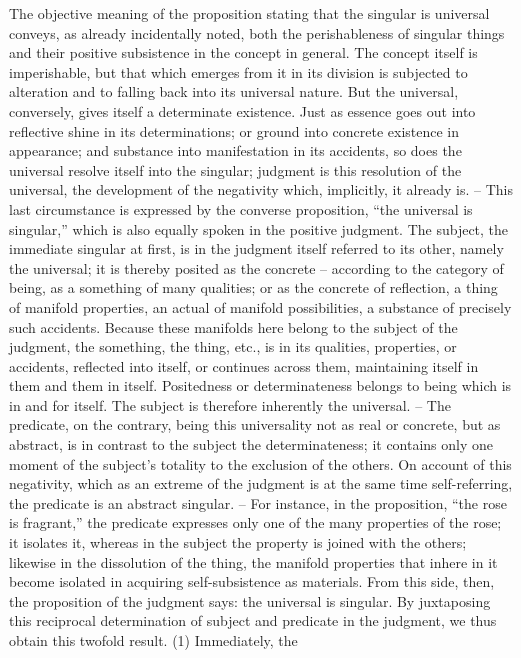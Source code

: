 The objective meaning of the proposition stating that the singular is
universal conveys, as already incidentally noted, both the perishableness of
singular things and their positive subsistence in the concept in general. The
concept itself is imperishable, but that which emerges from it in its division
is subjected to alteration and to falling back into its universal nature. But
the universal, conversely, gives itself a determinate existence. Just as essence
goes out into reflective shine in its determinations; or ground into concrete
existence in appearance; and substance into manifestation in its accidents, so
does the universal resolve itself into the singular; judgment is this resolution
of the universal, the development of the negativity which, implicitly, it
already is. – This last circumstance is expressed by the converse proposition,
“the universal is singular,” which is also equally spoken in the positive
judgment. The subject, the immediate singular at first, is in the judgment
itself referred to its other, namely the universal; it is thereby posited as
the concrete – according to the category of being, as a something of many
qualities; or as the concrete of reflection, a thing of manifold properties, an
actual of manifold possibilities, a substance of precisely such accidents. Because
these manifolds here belong to the subject of the judgment, the something,
the thing, etc., is in its qualities, properties, or accidents, reflected into
itself, or continues across them, maintaining itself in them and them in
itself. Positedness or determinateness belongs to being which is in and
for itself. The subject is therefore inherently the universal. – The predicate,
on the contrary, being this universality not as real or concrete, but as
abstract, is in contrast to the subject the determinateness; it contains only
one moment of the subject's totality to the exclusion of the others. On
account of this negativity, which as an extreme of the judgment is at the
same time self-referring, the predicate is an abstract singular. – For instance,
in the proposition, “the rose is fragrant,” the predicate expresses only one
of the many properties of the rose; it isolates it, whereas in the subject
the property is joined with the others; likewise in the dissolution of the
thing, the manifold properties that inhere in it become isolated in acquiring
self-subsistence as materials. From this side, then, the proposition of the
judgment says: the universal is singular.
By juxtaposing this reciprocal determination of subject and predicate in
the judgment, we thus obtain this twofold result. (1) Immediately, the
